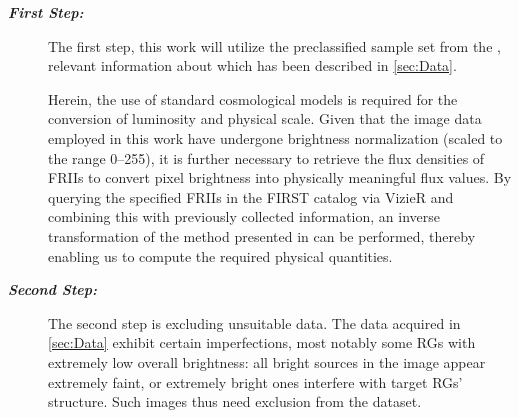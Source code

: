 \documentclass{aa}
\begin{document}
\begin{description}
    \item[\textbf{\textit{First Step:}}]
    The first step, this work will utilize the preclassified sample set from the \cite{griese_floriangrieseradiogalaxydataset_2022}, relevant information about which has been described in \autoref{sec:Data}. 

    Herein, the use of standard cosmological models is required for the conversion of luminosity and physical scale. Given that the image data employed in this work have undergone brightness normalization (scaled to the range 0–255), it is further necessary to retrieve the flux densities of FRIIs to convert pixel brightness into physically meaningful flux values. By querying the specified FRIIs in the FIRST catalog via VizieR and combining this with previously collected information, an inverse transformation of the method presented in \cite{griese_first_2023} can be performed, thereby enabling us to compute the required physical quantities.
    

    \item[\textbf{\textit{Second Step:}}]
    The second step is excluding unsuitable data. The data acquired in \autoref{sec:Data} exhibit certain imperfections, most notably some RGs with extremely low overall brightness: all bright sources in the image appear extremely faint, or extremely bright ones interfere with target RGs' structure. Such images thus need exclusion from the dataset.



\end{description}
\end{document}
